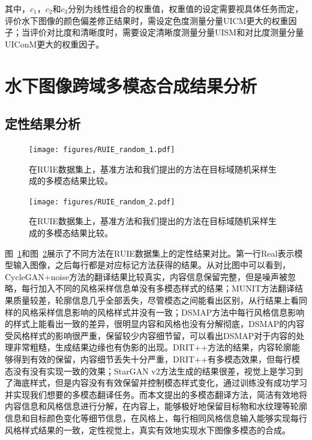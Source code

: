 其中，$c_1$，$c_2$和$c_3$分别为线性组合的权重值，权重值的设定需要视具体任务而定，评价水下图像的颜色偏差修正结果时，需设定色度测量分量UICM更大的权重因子；当评价对比度和清晰度时，需要设定清晰度测量分量UISM和对比度测量分量UIConM更大的权重因子。

\section{水下图像跨域多模态合成结果分析}
\subsection{定性结果分析}

\begin{figure}
    \centering
	\texttt{[image: figures/RUIE\_random\_1.pdf]}
	\caption{在RUIE数据集上，基准方法和我们提出的方法在目标域随机采样生成的多模态结果比较。}
	\label{fig:ruie_random_1}
\end{figure}

\begin{figure}
    \centering
	\texttt{[image: figures/RUIE\_random\_2.pdf]}
	\caption{在RUIE数据集上，基准方法和我们提出的方法在目标域随机采样生成的多模态结果比较。}
	\label{fig:ruie_random_2}
\end{figure}

图~\ref{fig:ruie_random_1}和图~\ref{fig:ruie_random_2}展示了不同方法在RUIE数据集上的定性结果对比。第一行Real表示模型输入图像，之后每行都是对应标记方法获得的结果。从对比图中可以看到，CycleGAN+noise方法的翻译结果比较真实，内容信息保留完整，但是噪声被忽略，每行加入不同的风格采样信息单没有多模态样式的结果；MUNIT方法翻译结果质量较差，轮廓信息几乎全部丢失，尽管模态之间能看出区别，从行结果上看同样的风格采样信息影响的风格样式并没有一致；DSMAP方法中每行风格信息影响的样式上能看出一致的差异，很明显内容和风格也没有分解彻底，DSMAP的内容受风格样式的影响很严重，保留较少内容细节留，可以看出DSMAP对于内容的处理非常粗糙，生成结果边缘也有伪影的出现。DRIT++方法的结果，内容轮廓能够得到有效的保留，内容细节丢失十分严重，DRIT++有多模态效果，但每行模态没有没有实现一致的效果；StarGAN v2方法生成的结果很差，视觉上是学习到了海底样式，但是内容没有有效保留并控制模态样式变化，通过训练没有成功学习并实现我们想要的多模态翻译任务。而本文提出的多模态翻译方法，简洁有效地将内容信息和风格信息进行分解，在内容上，能够极好地保留目标物和水纹理等轮廓信息和目标颜色变化等细节信息，在风格上，每行相同风格信息输入能够实现每行风格样式结果的一致，定性视觉上，真实有效地实现水下图像多模态的合成。

